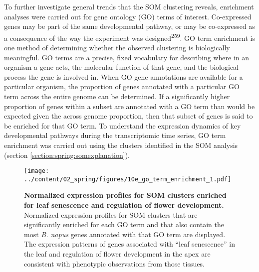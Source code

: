 \documentclass[12pt,]{book}
\begin{document}
To further investigate general trends that the SOM clustering reveals,
enrichment analyses were carried out for gene ontology (GO) terms of
interest. Co-expressed genes may be part of the same developmental
pathway, or may be co-expressed as a consequence of the way the
experiment was designed\textsuperscript{259}. GO term enrichment is one
method of determining whether the observed clustering is biologically
meaningful. GO terms are a precise, fixed vocabulary for describing
where in an organism a gene acts, the molecular function of that gene,
and the biological process the gene is involved in. When GO gene
annotations are available for a particular organism, the proportion of
genes annotated with a particular GO term across the entire genome can
be determined. If a significantly higher proportion of genes within a
subset are annotated with a GO term than would be expected given the
across genome proportion, then that subset of genes is said to be
enriched for that GO term. To understand the expression dynamics of key
developmental pathways during the transcriptomic time series, GO term
enrichment was carried out using the clusters identified in the SOM
analysis (section \ref{section:spring:somexplanation}).

\begin{figure}[htbp]
\centering
\texttt{[image: ../content/02\_spring/figures/10e\_go\_term\_enrichment\_1.pdf]}
\caption{\textbf{Normalized expression profiles for SOM clusters
enriched for leaf senescence and regulation of flower development.}
Normalized expression profiles for SOM clusters that are significantly
enriched for each GO term and that also contain the most \emph{B. napus}
genes annotated with that GO term are displayed. The expression patterns
of genes associated with ``leaf senescence'' in the leaf and regulation
of flower development in the apex are consistent with phenotypic
observations from those tissues.}\label{figure:219:go1som}
\end{figure}
\end{document}
